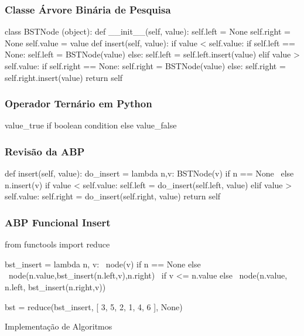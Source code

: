 \begin{frame}[fragile]
    \frametitle{Classe Árvore Binária de Pesquisa}
    \begin{python}
class BSTNode (object):
    def __init__(self, value):
        self.left = None
        self.right = None
        self.value = value
    def insert(self, value):
        if value < self.value:
            if self.left == None: self.left = BSTNode(value)
            else: self.left = self.left.insert(value)
        elif value > self.value:
            if self.right == None: self.right = BSTNode(value)
            else: self.right = self.right.insert(value)
        return self
    \end{python}
\end{frame}
\begin{frame}
    \frametitle{Operador Ternário em Python}
    \begin{center}
        \normalsize\ttfamily
        value\_true {\color{green}if} boolean condition {\color{green}else} value\_false
    \end{center}
\end{frame}
\begin{frame}[fragile]
    \frametitle{Revisão da ABP}
    \begin{python}
    def insert(self, value):
        do_insert = lambda n,v: BSTNode(v) if n == None \
                                else n.insert(v)
        if value < self.value:
            self.left = do_insert(self.left, value)
        elif value > self.value:
            self.right = do_insert(self.right, value)
        return self
    \end{python}
\end{frame}
\begin{frame}[fragile]
    \frametitle{ABP Funcional Insert}
    \begin{python}
    from functools import reduce

    bst_insert = lambda n, v: \
            node(v) if n == None else \
              node(n.value,bst_insert(n.left,v),n.right) \
                if v <= n.value else \
                  node(n.value, n.left, bst_insert(n.right,v))

    bst = reduce(bst_insert, [ 3, 5, 2, 1, 4, 6 ], None)
    \end{python}
\end{frame}

\begin{frame}
    \begin{center}
        \Huge Implementação de Algoritmos
    \end{center}
\end{frame}

